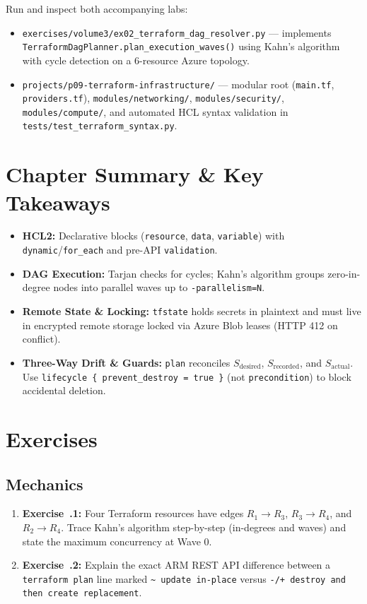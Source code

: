 \begin{labbridgebox}
Run and inspect both accompanying labs:
\begin{itemize}[leftmargin=12pt]
  \item \texttt{exercises/volume3/ex02\_terraform\_dag\_resolver.py} --- implements \texttt{TerraformDagPlanner.plan\_execution\_waves()} using Kahn's algorithm with cycle detection on a 6-resource Azure topology.
  \item \texttt{projects/p09-terraform-infrastructure/} --- modular root (\texttt{main.tf}, \texttt{providers.tf}), \texttt{modules/networking/}, \texttt{modules/security/}, \texttt{modules/compute/}, and automated HCL syntax validation in \texttt{tests/test\_terraform\_syntax.py}.
\end{itemize}
\end{labbridgebox}

\section{Chapter Summary \protect\& Key Takeaways}
\begin{itemize}[leftmargin=15pt]
  \item \textbf{HCL2:} Declarative blocks (\texttt{resource}, \texttt{data}, \texttt{variable}) with \texttt{dynamic}/\texttt{for\_each} and pre-API \texttt{validation}.
  \item \textbf{DAG Execution:} Tarjan checks for cycles; Kahn's algorithm groups zero-in-degree nodes into parallel waves up to \texttt{-parallelism=N}.
  \item \textbf{Remote State \& Locking:} \texttt{tfstate} holds secrets in plaintext and must live in encrypted remote storage locked via Azure Blob leases (HTTP 412 on conflict).
  \item \textbf{Three-Way Drift \& Guards:} \texttt{plan} reconciles $S_{\text{desired}}$, $S_{\text{recorded}}$, and $S_{\text{actual}}$. Use \texttt{lifecycle \{ prevent\_destroy = true \}} (not \texttt{precondition}) to block accidental deletion.
\end{itemize}

\section{Exercises}

\subsection{Mechanics}
\begin{enumerate}[leftmargin=18pt]
  \item \textbf{Exercise~\thechapter.1:} Four Terraform resources have edges $R_1 \to R_3$, $R_3 \to R_4$, and $R_2 \to R_4$. Trace Kahn's algorithm step-by-step (in-degrees and waves) and state the maximum concurrency at Wave 0.
  \item \textbf{Exercise~\thechapter.2:} Explain the exact ARM REST API difference between a \texttt{terraform plan} line marked \texttt{\textasciitilde{} update in-place} versus \texttt{-/+ destroy and then create replacement}.
\end{enumerate}

